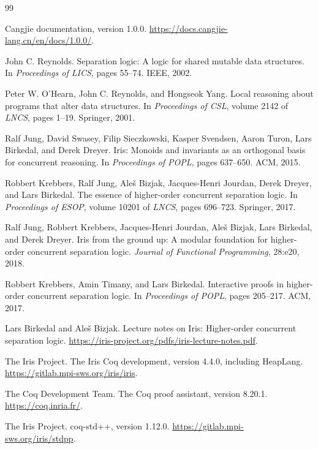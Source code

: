 \documentclass[11pt]{article}
\begin{document}
\begin{thebibliography}{99}

Cangjie documentation, version 1.0.0.
\url{https://docs.cangjie-lang.cn/en/docs/1.0.0/}.

John C. Reynolds.
Separation logic: A logic for shared mutable data structures.
In \emph{Proceedings of LICS}, pages 55--74. IEEE, 2002.

Peter W. O'Hearn, John C. Reynolds, and Hongseok Yang.
Local reasoning about programs that alter data structures.
In \emph{Proceedings of CSL}, volume 2142 of \emph{LNCS}, pages 1--19. Springer, 2001.

Ralf Jung, David Swasey, Filip Sieczkowski, Kasper Svendsen, Aaron Turon, Lars Birkedal, and Derek Dreyer.
Iris: Monoids and invariants as an orthogonal basis for concurrent reasoning.
In \emph{Proceedings of POPL}, pages 637--650. ACM, 2015.

Robbert Krebbers, Ralf Jung, Ale\v{s} Bizjak, Jacques-Henri Jourdan, Derek Dreyer, and Lars Birkedal.
The essence of higher-order concurrent separation logic.
In \emph{Proceedings of ESOP}, volume 10201 of \emph{LNCS}, pages 696--723. Springer, 2017.

Ralf Jung, Robbert Krebbers, Jacques-Henri Jourdan, Ale\v{s} Bizjak, Lars Birkedal, and Derek Dreyer.
Iris from the ground up: A modular foundation for higher-order concurrent separation logic.
\emph{Journal of Functional Programming}, 28:e20, 2018.

Robbert Krebbers, Amin Timany, and Lars Birkedal.
Interactive proofs in higher-order concurrent separation logic.
In \emph{Proceedings of POPL}, pages 205--217. ACM, 2017.

Lars Birkedal and Ale\v{s} Bizjak.
Lecture notes on Iris: Higher-order concurrent separation logic.
\url{https://iris-project.org/pdfs/iris-lecture-notes.pdf}.

The Iris Project.
The Iris Coq development, version 4.4.0, including HeapLang.
\url{https://gitlab.mpi-sws.org/iris/iris}.

The Coq Development Team.
The Coq proof assistant, version 8.20.1.
\url{https://coq.inria.fr/}.

The Iris Project.
coq-std++, version 1.12.0.
\url{https://gitlab.mpi-sws.org/iris/stdpp}.


\end{thebibliography}
\end{document}
